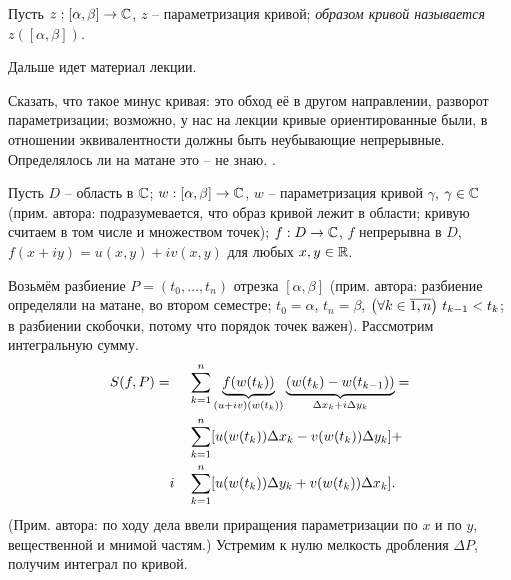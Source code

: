 \begin{definition}
	Пусть $z: [\alpha, \beta] \to \mathbb{C}$, $z$ -- параметризация кривой; \it{образом кривой} называется $z([\alpha, \beta])$.
\end{definition}

Дальше идет материал лекции.

{\color{red} Сказать, что такое минус кривая: это обход её в другом направлении, разворот параметризации; возможно, у нас на лекции кривые ориентированные были, в отношении эквивалентности должны быть неубывающие непрерывные. Определялось ли на матане это -- не знаю. }.

Пусть $D$ -- область в $\mathbb{C}$; $w: [\alpha, \beta] \to \mathbb{C}$, $w$ -- параметризация кривой $\gamma$, $\gamma \in \mathbb{C}$ (прим. автора: подразумевается, что образ кривой лежит в области; кривую считаем в том числе и множеством точек); $f: D \to \mathbb{C}$, $f$ непрерывна в $D$, $f(x + iy) = u(x, y) + iv(x, y)$ для любых $x, y \in \mathbb{R}$.

Возьмём разбиение $P = (t_0, \ldots, t_n)$ отрезка $[\alpha, \beta]$ (прим. автора: разбиение определяли на матане, во втором семестре; $t_0 = \alpha$, $t_n = \beta$, $\mathopen{}\left( \forall k \in \overline{1, n} \right)\mathclose{} \,\, t_{k - 1} < t_k$; в разбиении скобочки, потому что порядок точек важен). Рассмотрим интегральную сумму.
\[
	\begin{aligned}
		S(f, P) = & && \sum_{k = 1}^n \underbrace{f(w(t_k))}_{(u+iv)(w(t_k))} \underbrace{\mathopen{}\left( w(t_k) - w(t_{k - 1}) \right)\mathclose{}}_{\Delta x_k + i \Delta y_k} = \\
		& && \sum_{k = 1}^n \mathopen{}\left[ u(w(t_k)) \Delta x_k - v(w(t_k)) \Delta y_k \right]\mathclose{} + \\
		& i && \sum_{k = 1}^n \mathopen{}\left[ u(w(t_k)) \Delta y_k + v(w(t_k)) \Delta x_k \right]\mathclose{}.
	\end{aligned}
\]
(Прим. автора: по ходу дела ввели приращения параметризации по $x$ и по $y$, вещественной и мнимой частям.) Устремим к нулю мелкость дробления $\Delta P$, получим интеграл по кривой.

